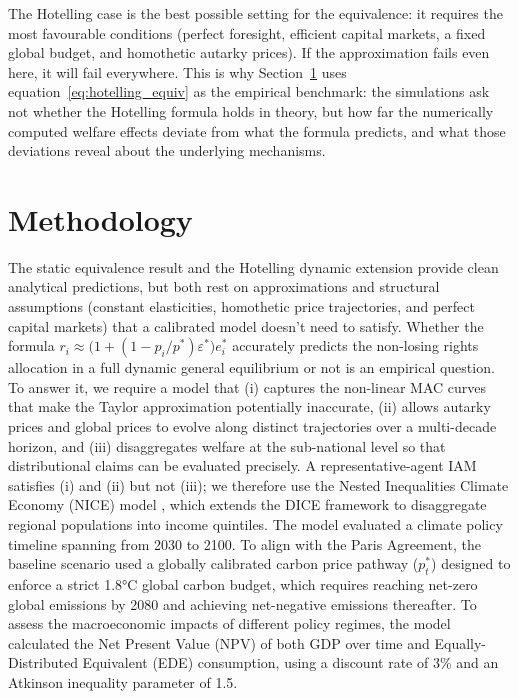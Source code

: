\documentclass[12pt,english]{article}
\begin{document}
The Hotelling case is the best possible setting for the equivalence: it requires the most favourable conditions (perfect foresight, efficient capital markets, a fixed global budget, and homothetic autarky prices). If the approximation fails even here, it will fail everywhere. This is why Section~\ref{sec:methodology} uses equation~\eqref{eq:hotelling_equiv} as the empirical benchmark: the simulations ask not whether the Hotelling formula holds in theory, but how far the numerically computed welfare effects deviate from what the formula predicts, and what those deviations reveal about the underlying mechanisms.


\section{Methodology}
\label{sec:methodology}


The static equivalence result and the Hotelling dynamic extension provide clean analytical predictions, but both rest on approximations and structural assumptions (constant elasticities, homothetic price trajectories, and perfect capital markets) that a calibrated model doesn't need to satisfy. Whether the formula $r_i \approx \bigl(1 + (1 - p_i/p^*)\varepsilon^*\bigr)e^*_i$ accurately predicts the non-losing rights allocation in a full dynamic general equilibrium or not is an empirical question. To answer it, we require a model that (i) captures the non-linear MAC curves that make the Taylor approximation potentially inaccurate, (ii) allows autarky prices and global prices to evolve along distinct trajectories over a multi-decade horizon, and (iii) disaggregates welfare at the sub-national level so that distributional claims can be evaluated precisely. A representative-agent IAM satisfies (i) and (ii) but not (iii); we therefore use the Nested Inequalities Climate Economy (NICE) model \citep{youngbrun2025}, which extends the DICE framework to disaggregate regional populations into income quintiles. The model evaluated a climate policy timeline spanning from 2030 to 2100. To align with the Paris Agreement, the baseline scenario used a globally calibrated carbon price pathway ($p_t^*$) designed to enforce a strict 1.8°C global carbon budget, which requires reaching net-zero global emissions by 2080 and achieving net-negative emissions thereafter. To assess the macroeconomic impacts of different policy regimes, the model calculated the Net Present Value (NPV) of both GDP over time and Equally-Distributed Equivalent (EDE) consumption, using a discount rate of 3\% and an Atkinson inequality parameter of 1.5.
\end{document}
